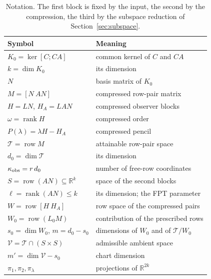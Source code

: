 \documentclass[journal]{IEEEtran}
\theoremstyle{plainn}
\theoremstyle{remark}
\begin{document}
\begin{table}[!t]
\centering
\caption{Notation. The first block is fixed by the input, the second by the compression, the third by
the subspace reduction of Section~\ref{sec:subspace}.}
\label{tab:notation}
\footnotesize
\begin{tabular}{@{}ll@{}}
\toprule
Symbol & Meaning \\
\midrule
$K_0=\ker[C;CA]$ & common kernel of $C$ and $CA$ \\
$k=\dim K_0$ & its dimension \\
$N$ & basis matrix of $K_0$ \\
$M=[N\ AN]$ & compressed row-pair matrix \\
\midrule
$H=LN$, $H_A=LAN$ & compressed observer blocks \\
$\omega=\operatorname{rank}H$ & compressed order \\
$P(\lambda)=\lambda H-H_A$ & compressed pencil \\
\midrule
$\mathcal T=\operatorname{row}M$ & attainable row-pair space \\
$d_0=\dim\mathcal T$ & its dimension \\
$\kappa_{\rm obs}=r\,d_0$ & number of free-row coordinates \\
$S=\operatorname{row}(AN)\subseteq\mathbb R^k$ & space of the second blocks \\
$\ell=\operatorname{rank}(AN)\le k$ & its dimension; the FPT parameter \\
$W=\operatorname{row}[H\ H_A]$ & row space of the compressed pairs \\
$W_0=\operatorname{row}(L_0M)$ & contribution of the prescribed rows \\
$s_0=\dim W_0$, $m=d_0-s_0$ & dimensions of $W_0$ and of $\mathcal T/W_0$ \\
$\mathcal V=\mathcal T\cap(S\times S)$ & admissible ambient space \\
$m'=\dim\mathcal V-s_0$ & chart dimension \\
$\pi_1,\pi_2,\pi_\lambda$ & projections of $\mathbb R^{2k}$ \\
\bottomrule
\end{tabular}
\end{table}
\end{document}
